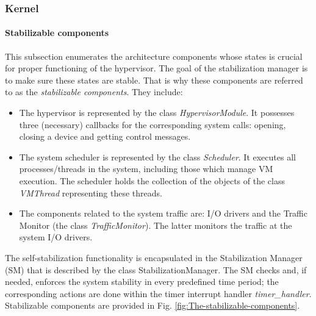 \subsubsection{Kernel}


\paragraph{Stabilizable components}

This subsection enumerates the architecture components whose states
is crucial for proper functioning of the hypervisor. The goal of the
stabilization manager is to make sure these states are stable. That
is why these components are referred to as the \textit{stabilizable
components}. They include:
\begin{itemize}
\item The hypervisor is represented by the class \textit{HypervisorModule}.
It possesses three (necessary) callbacks for the corresponding system
calls: opening, closing a device and getting control messages. 
\item The system scheduler is represented by the class \textit{Scheduler}.
It executes all processes/threads in the system, including those which
manage VM execution. The scheduler holds the collection of the objects
of the class \textit{VMThread} representing these threads. 
\item The components related to the system traffic are: I/O drivers and
the Traffic Monitor (the class \textit{TrafficMonitor}). The latter
monitors the traffic at the system I/O drivers.
\end{itemize}
The self-stabilization functionality is encapsulated in the Stabilization
Manager (SM) that is described by the class StabilizationManager.
The SM checks and, if needed, enforces the system stability in every
predefined time period; the corresponding actions are done within
the timer interrupt handler \textit{timer\_handler}. Stabilizable
components are provided in Fig. \ref{fig:The-stabilizable-components}. 

